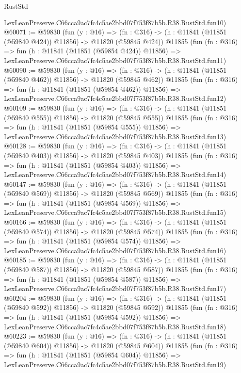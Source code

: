 \begin{lexlean}{RustStd}
\begin{coremodule}
    LexLeanPreserve.C66cca9ac7fc4c5ae2bbd07f753f87b5b.R38.RustStd.fun10)
@60071 := @59830
    (fun (y : @16) =>
    (fn : @316) -> (h : @11841 (@11851 (@59840 @424)) @11856) -> @11820 (@59845 @424))
    @11855
    (fun (fn : @316) =>
    fun (h : @11841 (@11851 (@59854 @424)) @11856) =>
    LexLeanPreserve.C66cca9ac7fc4c5ae2bbd07f753f87b5b.R38.RustStd.fun11)
@60090 := @59830
    (fun (y : @16) =>
    (fn : @316) -> (h : @11841 (@11851 (@59840 @462)) @11856) -> @11820 (@59845 @462))
    @11855
    (fun (fn : @316) =>
    fun (h : @11841 (@11851 (@59854 @462)) @11856) =>
    LexLeanPreserve.C66cca9ac7fc4c5ae2bbd07f753f87b5b.R38.RustStd.fun12)
@60109 := @59830
    (fun (y : @16) =>
    (fn : @316) -> (h : @11841 (@11851 (@59840 @555)) @11856) -> @11820 (@59845 @555))
    @11855
    (fun (fn : @316) =>
    fun (h : @11841 (@11851 (@59854 @555)) @11856) =>
    LexLeanPreserve.C66cca9ac7fc4c5ae2bbd07f753f87b5b.R38.RustStd.fun13)
@60128 := @59830
    (fun (y : @16) =>
    (fn : @316) -> (h : @11841 (@11851 (@59840 @403)) @11856) -> @11820 (@59845 @403))
    @11855
    (fun (fn : @316) =>
    fun (h : @11841 (@11851 (@59854 @403)) @11856) =>
    LexLeanPreserve.C66cca9ac7fc4c5ae2bbd07f753f87b5b.R38.RustStd.fun14)
@60147 := @59830
    (fun (y : @16) =>
    (fn : @316) -> (h : @11841 (@11851 (@59840 @569)) @11856) -> @11820 (@59845 @569))
    @11855
    (fun (fn : @316) =>
    fun (h : @11841 (@11851 (@59854 @569)) @11856) =>
    LexLeanPreserve.C66cca9ac7fc4c5ae2bbd07f753f87b5b.R38.RustStd.fun15)
@60166 := @59830
    (fun (y : @16) =>
    (fn : @316) -> (h : @11841 (@11851 (@59840 @574)) @11856) -> @11820 (@59845 @574))
    @11855
    (fun (fn : @316) =>
    fun (h : @11841 (@11851 (@59854 @574)) @11856) =>
    LexLeanPreserve.C66cca9ac7fc4c5ae2bbd07f753f87b5b.R38.RustStd.fun16)
@60185 := @59830
    (fun (y : @16) =>
    (fn : @316) -> (h : @11841 (@11851 (@59840 @587)) @11856) -> @11820 (@59845 @587))
    @11855
    (fun (fn : @316) =>
    fun (h : @11841 (@11851 (@59854 @587)) @11856) =>
    LexLeanPreserve.C66cca9ac7fc4c5ae2bbd07f753f87b5b.R38.RustStd.fun17)
@60204 := @59830
    (fun (y : @16) =>
    (fn : @316) -> (h : @11841 (@11851 (@59840 @592)) @11856) -> @11820 (@59845 @592))
    @11855
    (fun (fn : @316) =>
    fun (h : @11841 (@11851 (@59854 @592)) @11856) =>
    LexLeanPreserve.C66cca9ac7fc4c5ae2bbd07f753f87b5b.R38.RustStd.fun18)
@60223 := @59830
    (fun (y : @16) =>
    (fn : @316) -> (h : @11841 (@11851 (@59840 @604)) @11856) -> @11820 (@59845 @604))
    @11855
    (fun (fn : @316) =>
    fun (h : @11841 (@11851 (@59854 @604)) @11856) =>
    LexLeanPreserve.C66cca9ac7fc4c5ae2bbd07f753f87b5b.R38.RustStd.fun19)

\end{coremodule}
\end{lexlean}
